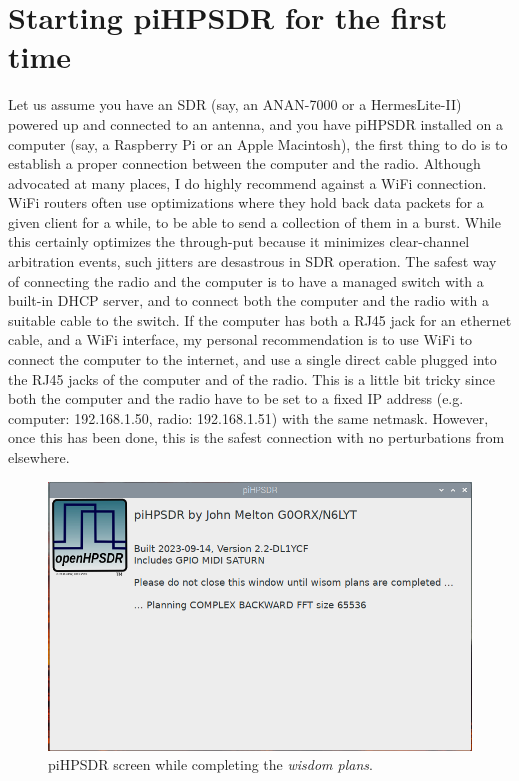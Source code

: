 \documentclass[12pt]{book}
\begin{document}
\chapter{Starting piHPSDR for the first time}
Let us assume you have an SDR (say, an ANAN-7000 or a HermesLite-II) powered up and connected to an antenna,
and you have piHPSDR installed on a computer (say, a Raspberry Pi or an Apple Macintosh), the first thing to
do is to establish a proper connection between the computer and the radio. Although advocated at many
places,
I do highly recommend against a WiFi connection. WiFi routers often use optimizations where they hold
back data packets for a given client for a while, to be able to send a collection of them in a burst. While
this certainly optimizes the through-put because it minimizes clear-channel arbitration events, such jitters
are desastrous in SDR operation. The safest way of connecting the radio and the computer is to have a
managed switch with a built-in DHCP server, and to connect both the computer and the radio with a suitable
cable to the switch. If the computer has both a RJ45 jack for an ethernet cable, and a WiFi interface, my
personal recommendation is to use WiFi to connect the computer to the internet, and use a single direct
cable plugged
into the RJ45 jacks of the computer and of the radio. This is a little bit tricky since both the computer
and the radio have to be set to a fixed IP address (e.g. computer: 192.168.1.50, radio: 192.168.1.51) with
the same netmask. However, once this has been done, this is the safest connection with no perturbations from
elsewhere.

\begin{figure}
\center
\includegraphics[width=12cm]{Planning.png}
\caption{piHPSDR screen while completing the \textit{wisdom plans}.}
\label{fig:Planning}
\end{figure}
\end{document}
